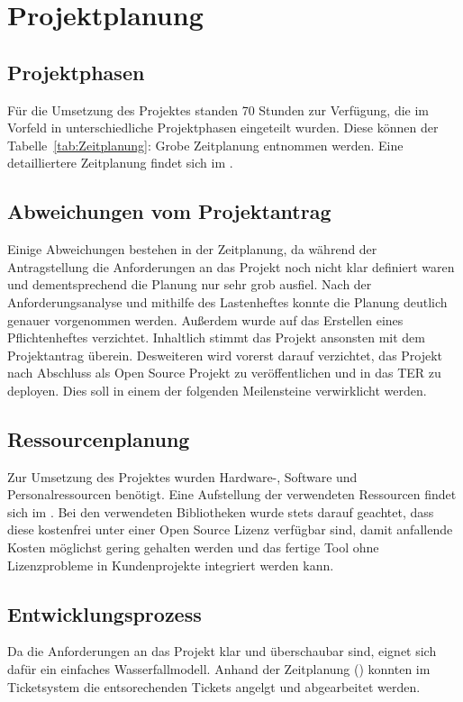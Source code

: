 \section{Projektplanung} 
\label{sec:Projektplanung}


\subsection{Projektphasen}
\label{sec:Projektphasen}
Für die Umsetzung des Projektes standen 70 Stunden zur Verfügung, die im Vorfeld in unterschiedliche Projektphasen eingeteilt wurden. Diese können der Tabelle~\ref{tab:Zeitplanung}: Grobe Zeitplanung entnommen werden. Eine detailliertere Zeitplanung findet sich im . 



\subsection{Abweichungen vom Projektantrag}
\label{sec:AbweichungenProjektantrag}

Einige Abweichungen bestehen in der Zeitplanung, da während der Antragstellung die Anforderungen an das Projekt noch nicht klar definiert waren und dementsprechend die Planung nur sehr grob ausfiel. Nach der Anforderungsanalyse und mithilfe des Lastenheftes konnte die Planung deutlich genauer vorgenommen werden. Außerdem wurde auf das Erstellen eines Pflichtenheftes verzichtet. Inhaltlich stimmt das Projekt ansonsten mit dem Projektantrag überein. Desweiteren wird vorerst darauf verzichtet, das Projekt nach Abschluss als Open Source Projekt zu veröffentlichen und in das \ac{TER} zu deployen. Dies soll in einem der folgenden Meilensteine verwirklicht werden.


\subsection{Ressourcenplanung}
\label{sec:Ressourcenplanung}

Zur Umsetzung des Projektes wurden Hardware-, Software und Personalressourcen benötigt. Eine Aufstellung der verwendeten Ressourcen findet sich im . Bei den verwendeten Bibliotheken wurde stets darauf geachtet, dass diese kostenfrei unter einer Open Source Lizenz verfügbar sind, damit anfallende Kosten möglichst gering gehalten werden und das fertige Tool ohne Lizenzprobleme in Kundenprojekte integriert werden kann.


\subsection{Entwicklungsprozess}
\label{sec:Entwicklungsprozess}

Da die Anforderungen an das Projekt klar und überschaubar sind, eignet sich dafür ein einfaches Wasserfallmodell. Anhand der Zeitplanung () konnten im Ticketsystem die entsorechenden Tickets angelgt und abgearbeitet werden.
